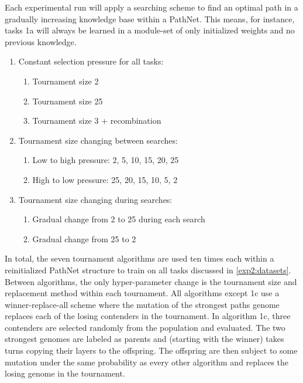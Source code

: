 Each experimental run will apply a searching scheme to find an optimal path in a gradually increasing knowledge base within a PathNet. This means, for instance, tasks 1a will always be learned in a module-set of only initialized weights and no previous knowledge. 
\begin{enumerate}
    \item Constant selection pressure for all tasks:
    \begin{enumerate}
        \item Tournament size 2
        \item Tournament size 25
        \item Tournament size 3 + recombination
    \end{enumerate}
    \item Tournament size changing between searches:
    \begin{enumerate}
        \item Low to high pressure: 2, 5, 10, 15, 20, 25
        \item High to low pressure: 25, 20, 15, 10, 5, 2
    \end{enumerate}
    \item Tournament size changing during searches:
    \begin{enumerate}
        \item Gradual change from 2 to 25 during each search
        \item Gradual change from 25 to 2 
    \end{enumerate}
\end{enumerate}
In total, the seven tournament algorithms are used ten times each within a reinitialized PathNet structure to train on all tasks discussed in \ref{exp2:datasets}. Between algorithms, the only hyper-parameter change is the tournament size and replacement method within each tournament. All algorithms except 1c use a winner-replace-all scheme where the mutation of the strongest paths genome replaces each of the losing contenders in the tournament. In algorithm 1c, three contenders are selected randomly from the population and evaluated. The two strongest genomes are labeled as parents and (starting with the winner) takes turns copying their layers to the offspring. The offspring are then subject to some mutation under the same probability as every other algorithm and replaces the losing genome in the tournament.
